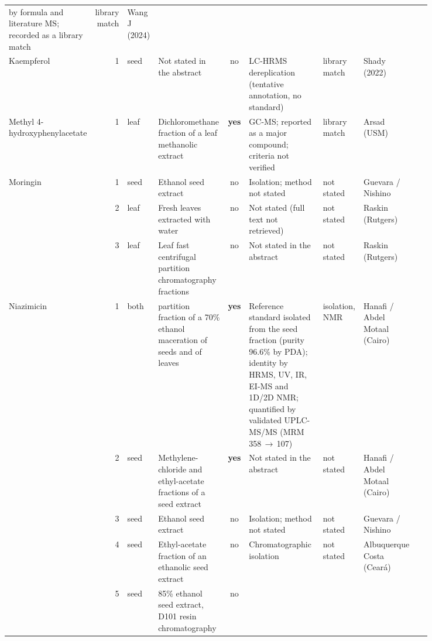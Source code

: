 \begin{landscape}
\begin{longtable}{@{}L{0.11\linewidth} r l L{0.18\linewidth} c L{0.23\linewidth}
    L{0.075\linewidth} L{0.11\linewidth} L{0.13\linewidth}@{}}
      by formula and literature MS; recorded as a library match & library match
    & Wang J (2024) &  \\
  \addlinespace
  Kaempferol & 1 & seed & Not stated in the abstract & no & LC-HRMS dereplication (tentative
      annotation, no standard) & library match & Shady (2022)
    &  \\
  \addlinespace
  Methyl 4-hydroxyphenylacetate & 1 & leaf & Dichloromethane fraction of a leaf methanolic
      extract & \textbf{yes} & GC-MS; reported as a major compound; criteria not verified
    & library match & Arsad (USM) &  \\
  \addlinespace
  Moringin & 1 & seed & Ethanol seed extract & no & Isolation; method not stated
    & not stated & Guevara / Nishino &  \\
   & 2 & leaf & Fresh leaves extracted with water & no & Not stated (full text not
      retrieved) & not stated & Raskin (Rutgers) &  \\
   & 3 & leaf & Leaf fast centrifugal partition chromatography fractions & no
    & Not stated in the abstract & not stated & Raskin (Rutgers) &  \\
  \addlinespace
  Niazimicin & 1 & both &  partition fraction of a 70\% ethanol maceration of
      seeds and of leaves & \textbf{yes} & Reference standard isolated from the seed
       fraction (purity 96.6\% by PDA); identity by HRMS, UV, IR, EI-MS and 1D/2D
      NMR; quantified by validated UPLC-MS/MS (MRM 358\,$\rightarrow$\,107)
    & isolation, NMR & Hanafi / Abdel Motaal (Cairo) &  \\
   & 2 & seed & Methylene-chloride and ethyl-acetate fractions of a seed extract
    & \textbf{yes} & Not stated in the abstract & not stated & Hanafi / Abdel Motaal (Cairo)
    &  \\
   & 3 & seed & Ethanol seed extract & no & Isolation; method not stated & not stated
    & Guevara / Nishino &  \\
   & 4 & seed & Ethyl-acetate fraction of an ethanolic seed extract & no
    & Chromatographic isolation & not stated & Albuquerque Costa (Ceará)
    &  \\
   & 5 & seed & 85\% ethanol seed extract, D101 resin chromatography & no

\end{longtable}
\end{landscape}
